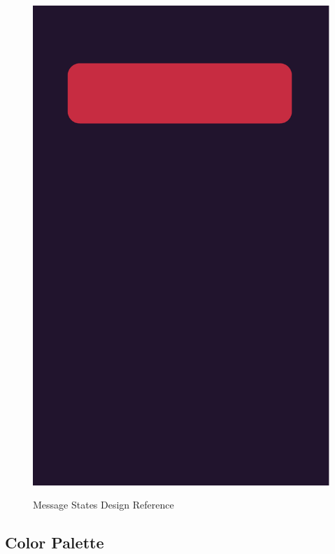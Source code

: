 \begin{figure}[H]
    \centering
    \includegraphics[height=0.85\textheight]{./graphics/message-states}\label{fig:figure3}
    \caption{Message States Design Reference}
\end{figure}

\subsection{Color Palette}\label{subsec:color-palette}

